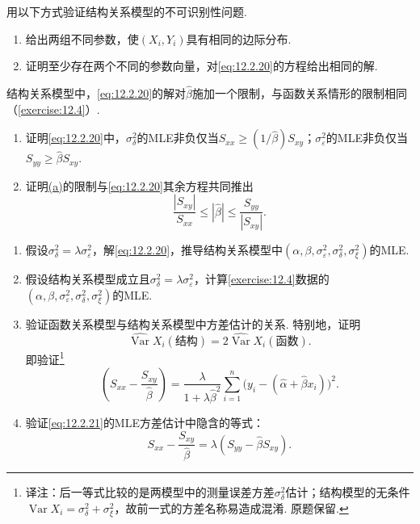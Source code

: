 \begin{exercise}\label{exercise:12.8}
用以下方式验证结构关系模型的不可识别性问题.
\begin{enumerate}[label=(\alph*)]
\item\label{item:12.8.a} 给出两组不同参数，使$(X_i,Y_i)$具有相同的边际分布.
\item\label{item:12.8.b} 证明至少存在两个不同的参数向量，对\eqref{eq:12.2.20}的方程给出相同的解.
\end{enumerate}
\end{exercise}

\begin{exercise}\label{exercise:12.9}
结构关系模型中，\eqref{eq:12.2.20}的解对$\hat\beta$施加一个限制，与函数关系情形的限制相同（\autoref{exercise:12.4}）.
\begin{enumerate}[label=(\alph*)]
\item\label{item:12.9.a} 证明\eqref{eq:12.2.20}中，$\sigma_\delta^2$的MLE非负仅当$S_{xx}\ge(1/\hat\beta)S_{xy}$；$\sigma_\varepsilon^2$的MLE非负仅当$S_{yy}\ge\hat\beta S_{xy}$.
\item\label{item:12.9.b} 证明\hyperref[item:12.9.a]{(a)}的限制与\eqref{eq:12.2.20}其余方程共同推出
$$\frac{|S_{xy}|}{S_{xx}}\le|\hat\beta|\le\frac{S_{yy}}{|S_{xy}|}.$$
\end{enumerate}
\end{exercise}

\begin{exercise}\label{exercise:12.10}\leavevmode
\begin{enumerate}[label=(\alph*)]
\item\label{item:12.10.a} 假设$\sigma_\delta^2=\lambda\sigma_\varepsilon^2$，解\eqref{eq:12.2.20}，推导结构关系模型中$(\alpha,\beta,\sigma_\varepsilon^2,\sigma_\delta^2,\sigma_\xi^2)$的MLE.
\item\label{item:12.10.b} 假设结构关系模型成立且$\sigma_\delta^2=\lambda\sigma_\varepsilon^2$，计算\autoref{exercise:12.4}数据的$(\alpha,\beta,\sigma_\varepsilon^2,\sigma_\delta^2,\sigma_\xi^2)$的MLE.
\item\label{item:12.10.c} 验证函数关系模型与结构关系模型中方差估计的关系. 特别地，证明
$$\widehat{\operatorname{Var}}X_i(\text{结构})=2\widehat{\operatorname{Var}}X_i(\text{函数}).$$
即验证\footnote{译注：后一等式比较的是两模型中的测量误差方差$\sigma_\delta^2$估计；结构模型的无条件$\operatorname{Var}X_i=\sigma_\delta^2+\sigma_\xi^2$，故前一式的方差名称易造成混淆. 原题保留.}
$$\left(S_{xx}-\frac{S_{xy}}{\hat\beta}\right)=\frac\lambda{1+\lambda\hat\beta^2}\sum_{i=1}^n\bigl(y_i-(\hat\alpha+\hat\beta x_i)\bigr)^2.$$
\item\label{item:12.10.d} 验证\eqref{eq:12.2.21}的MLE方差估计中隐含的等式：
$$S_{xx}-\frac{S_{xy}}{\hat\beta}=\lambda(S_{yy}-\hat\beta S_{xy}).$$
\end{enumerate}
\end{exercise}

